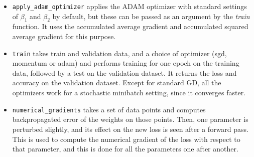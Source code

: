 \documentclass[12pt, a4paper]{article}
\begin{document}
\begin{itemize}
\item \texttt{apply\_adam\_optimizer} applies the ADAM optimizer with standard settings of $\beta_1$ and $\beta_2$ by default, but these can be passed as an argument by the \textit{train} function. It uses the accumulated average gradient and accumulated squared average gradient for this purpose. 

\item \texttt{train} takes train and validation data, and a choice of optimizer (sgd, momentum or adam) and performs training for one epoch on the training data, followed by a test on the validation dataset. It returns the loss and accuracy on the validation dataset. Except for standard GD, all the optimizers work for a stochastic minibatch setting, since it converges faster. 

\item \texttt{numerical\_gradients} takes a set of data points and computes backpropagated error of the weights on those points. Then, one parameter is perturbed slightly, and its effect on the new loss is seen after a forward pass. This is used to compute the numerical gradient of the loss with respect to that parameter, and this is done for all the parameters one after another.
 
 
\end{itemize}
\end{document}

